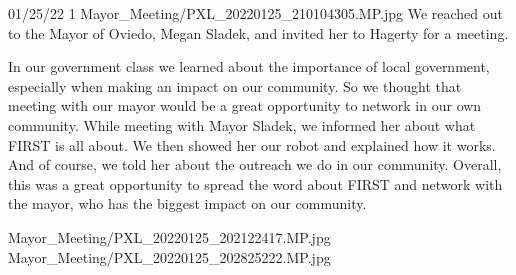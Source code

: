 {01/25/22}
{1}
{Mayor_Meeting/PXL_20220125_210104305.MP.jpg}
{We reached out to the Mayor of Oviedo, Megan Sladek, and invited her to Hagerty for a meeting.}
{In our government class we learned about the importance of local government, especially when making an impact on our community. So we thought that meeting with our mayor would be a great opportunity to network in our own community. While meeting with Mayor Sladek, we informed her about what FIRST is all about. We then showed her our robot and explained how it works. And of course, we told her about the outreach we do in our community. Overall, this was a great opportunity to spread the word about FIRST and network with the mayor, who has the biggest impact on our community.

} 
{Mayor_Meeting/PXL_20220125_202122417.MP.jpg}
{Mayor_Meeting/PXL_20220125_202825222.MP.jpg}